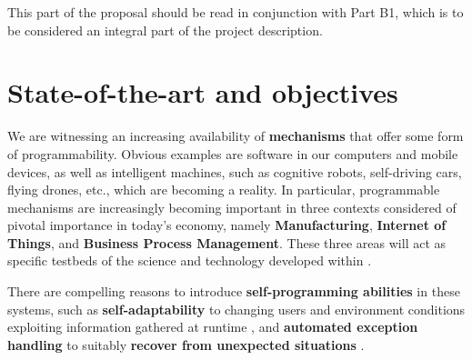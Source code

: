 This part of the proposal should be read in conjunction with Part B1,
which is to be considered an integral part of the project description. 


\section{State-of-the-art and objectives}





We are witnessing an increasing availability of \textbf{mechanisms}
that offer some form of programmability.  Obvious examples are 
software in our computers and mobile devices, as well as intelligent
machines, such as cognitive robots, self-driving cars, flying drones,
etc., which are becoming a reality.
In particular, programmable mechanisms are increasingly becoming
important in three contexts considered of pivotal importance in
today's economy,
namely \textbf{Manufacturing}, \textbf{Internet of Things},
and \textbf{Business Process Management}.  These three areas will act
as specific testbeds of the science and technology developed within
\project.


There are compelling reasons to introduce
\textbf{self-programming abilities} in these systems, such as
\textbf{self-adaptability} to changing users and environment
conditions exploiting information gathered at runtime
\cite{Seiger2016},  
and
\textbf{automated exception handling} to
suitably \textbf{recover from unexpected situations}
\cite{MarrellaMS17}. 



